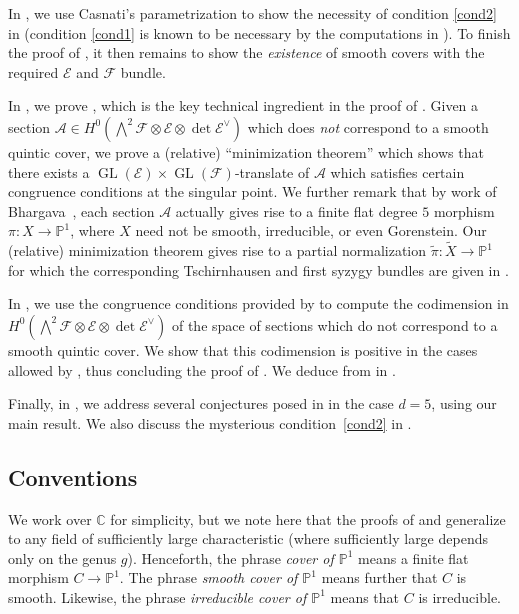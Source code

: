 \documentclass[11pt]{amsart}
\numberwithin{theorem}{section}
\numberwithin{equation}{section}
\theoremstyle{definition}\newtheorem{defn}[theorem]{Definition}
\theoremstyle{definition}\newtheorem{remark}[theorem]{Remark}
\theoremstyle{definition}\newtheorem{question}[theorem]{Question}
\theoremstyle{definition}\newtheorem{problem}[theorem]{Problem}
\newcommand{\CC}{\mathbb{C}}
\newcommand{\PP}{\mathbb{P}}
\newcommand{\cE}{\mathcal{E}}
\newcommand{\cF}{\mathcal{F}}
\newcommand{\cA}{\mathcal{A}}
\DeclareMathOperator{\GL}{GL}
\begin{document}
In , we use Casnati's parametrization to show the necessity of condition \ref{cond2} in  (condition \ref{cond1} is known to be necessary by the computations in \cite[Section~5]{CL}). To finish the proof of , it then remains to show the \emph{existence} of smooth covers with the required $\cE$ and $\cF$ bundle.

In , we prove , which is the key technical ingredient in the proof of . Given a section $\cA \in H^0( \bigwedge^2 \cF \otimes \cE \otimes \det \cE^{\vee})$ which does \emph{not} correspond to a smooth quintic cover, we prove a (relative) ``minimization theorem'' which shows that there exists a $\GL(\cE) \times \GL(\cF)$-translate of $\cA$ which satisfies certain congruence conditions at the singular point. We further remark that by work of Bhargava~\cite{B-hcl4}, each section $\cA$ actually gives rise to a finite flat degree $5$ morphism $\pi \colon X \rightarrow \PP^1$, where $X$ need not be smooth, irreducible, or even Gorenstein. Our (relative) minimization theorem gives rise to a partial normalization $\widetilde{\pi} \colon \widetilde{X} \to \PP^1$ for which the corresponding Tschirnhausen and first syzygy bundles are given in .

In , we use the congruence conditions provided by  to compute the codimension in $H^0( \bigwedge^2 \cF \otimes \cE \otimes \det \cE^{\vee})$ of the space of sections which do not correspond to a smooth quintic cover. We show that this codimension is positive in the cases allowed by , thus concluding the proof of . We deduce  from  in .

Finally, in , we address several conjectures posed in \cite[Section~8]{VV} in the case $d = 5$, using our main result. We also discuss the mysterious condition~\ref{cond2} in .

\subsection{Conventions}
We work over $\CC$ for simplicity, but we note here that the proofs of  and  generalize to any field of sufficiently large characteristic (where sufficiently large depends only on the genus $g$). Henceforth, the phrase \emph{cover of $\PP^1$} means a finite flat morphism $C \rightarrow \PP^1$. The phrase \emph{smooth cover of $\PP^1$} means further that $C$ is smooth. Likewise, the phrase \emph{irreducible cover of $\PP^1$} means that $C$ is irreducible. 
\end{document}
